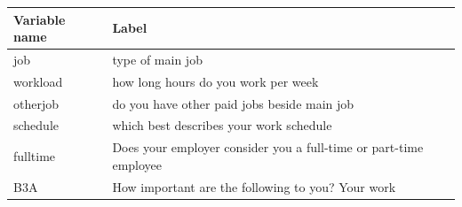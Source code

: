 \documentclass[
]{book}
\begin{document}
\begin{longtable}[]{@{}ll@{}}
\toprule
\begin{minipage}[b]{0.17\columnwidth}\raggedright
Variable name\strut
\end{minipage} & \begin{minipage}[b]{0.77\columnwidth}\raggedright
Label\strut
\end{minipage}\tabularnewline
\midrule
\endhead
\begin{minipage}[t]{0.17\columnwidth}\raggedright
job\strut
\end{minipage} & \begin{minipage}[t]{0.77\columnwidth}\raggedright
type of main job\strut
\end{minipage}\tabularnewline
\begin{minipage}[t]{0.17\columnwidth}\raggedright
workload\strut
\end{minipage} & \begin{minipage}[t]{0.77\columnwidth}\raggedright
how long hours do you work per week\strut
\end{minipage}\tabularnewline
\begin{minipage}[t]{0.17\columnwidth}\raggedright
otherjob\strut
\end{minipage} & \begin{minipage}[t]{0.77\columnwidth}\raggedright
do you have other paid jobs beside main job\strut
\end{minipage}\tabularnewline
\begin{minipage}[t]{0.17\columnwidth}\raggedright
schedule\strut
\end{minipage} & \begin{minipage}[t]{0.77\columnwidth}\raggedright
which best describes your work schedule\strut
\end{minipage}\tabularnewline
\begin{minipage}[t]{0.17\columnwidth}\raggedright
fulltime\strut
\end{minipage} & \begin{minipage}[t]{0.77\columnwidth}\raggedright
Does your employer consider you a full-time or part-time employee\strut
\end{minipage}\tabularnewline
\begin{minipage}[t]{0.17\columnwidth}\raggedright
B3A\strut
\end{minipage} & \begin{minipage}[t]{0.77\columnwidth}\raggedright
How important are the following to you? Your work\strut
\end{minipage}\tabularnewline

\end{longtable}
\end{document}
